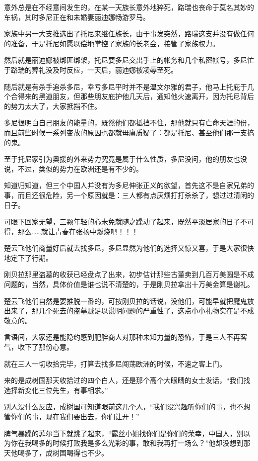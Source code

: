 意外总是在不经意间发生的，在某一天族长意外地猝死，路瑞也丧命于莫名其妙的车祸，其时多尼正在和未婚妻丽迪娜畅游罗马。

家族中另一大支推选出了托尼来继任族长，由于事发突然，路瑞这支并没有做任何的准备，于是托尼如愿以偿地掌控了家族的长老会，接管了家族权力。

然后就是丽迪娜被绑匪绑架，托尼要多尼交出手上的帐务和几个私密帐号，多尼忙于路瑞的葬礼没及时反应，一天后，丽迪娜被凌辱至死。

随后就是有杀手追杀多尼，幸亏多尼平时并不是温文尔雅的君子，他马上托庇于几个合得来的黑道朋友，但那些朋友庇护他几天后，通知他火速离开，因为托尼背后的势力太大了，大家抵挡不住。

多尼很明白自己朋友的能量的，既然他们都抵挡不住，那他就只有亡命天涯的份，而且前些时候一系列变故的原因也都就毋庸质疑了：都是托尼、甚至他们那一支搞的鬼。

至于托尼家引为奥援的外来势力究竟是属于什么性质，多尼没问，他的朋友也没说，不过，类似的势力在欧洲还是有不少的。

知道归知道，但三个中国人并没有为多尼伸张正义的欲望，首先这不是自家兄弟的事，而且还很危险，另一个原因就是：三人都有点厌烦打打杀杀了，想过过清闲的日子。

可眼下回家无望，三颗年轻的心未免就随之躁动了起来，既然平淡居家的日子不可得，那么……就让青春在张扬中燃烧吧！！！

楚云飞他们商量好后就去找多尼，多尼显然为他们的选择又惊又喜，于是大家很快地定下了行期。

刚贝拉那里盗墓的收获已经盘点了出来，初步估计那些古董卖到几百万美圆是不成问题的，当然，具体价值是谁也说不清楚的，于是刚贝拉拿出十万美金算是谢礼。

楚云飞他们自然是要推脱一番的，可按刚贝拉的话说，没他们，可能早就把魔鬼放出来了，那几个死去的盗墓贼足以说明问题的严重性了，这点小小礼物实在是不成敬意的。

言语间，大家还是能隐约感到肥胖商人对那种未知力量的恐怖，于是三人不再客气，收下了那份心意。

就在三人一切收拾完毕，打算去找多尼闯荡欧洲的时候，不速之客上门。

来的是成树国那天收拾过的四个白人，还是那个高个大眼睛的女士发话，“我们找选择新变化三位先生，有事相求。”

别人没什么反应，成树国可知道眼前这几个人，“我们没兴趣听你们的事，也不想管你们的事，现在我们要出去，你们让开！”

脾气暴躁的菲尔当下就跳了起来，“露丝小姐找你们是你们的荣幸，中国人，别以为你在我喝多的时候打败我是多么光彩的事，敢和我再打一场么？”他却没想到那天他喝多了，成树国喝得也不少。

